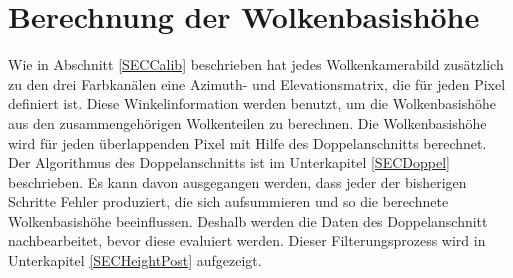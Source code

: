 \documentclass[a4paper,11pt,twoside,german]{article}
\begin{document}
\section{Berechnung der Wolkenbasishöhe}
Wie in Abschnitt \ref{SECCalib} beschrieben hat jedes Wolkenkamerabild zusätzlich zu den drei Farbkanälen eine Azimuth- und Elevationsmatrix, die für jeden Pixel definiert ist. Diese Winkelinformation werden benutzt, um die Wolkenbasishöhe aus den zusammengehörigen Wolkenteilen zu berechnen. Die Wolkenbasishöhe wird für jeden überlappenden Pixel mit Hilfe des Doppelanschnitts berechnet. Der Algorithmus des Doppelanschnitts ist im Unterkapitel \ref{SECDoppel} beschrieben. Es kann davon ausgegangen werden, dass jeder der bisherigen Schritte Fehler produziert, die sich aufsummieren und so die berechnete Wolkenbasishöhe beeinflussen. Deshalb werden die Daten des Doppelanschnitt nachbearbeitet, bevor diese evaluiert werden. Dieser Filterungsprozess wird in Unterkapitel \ref{SECHeightPost} aufgezeigt.
\end{document}
